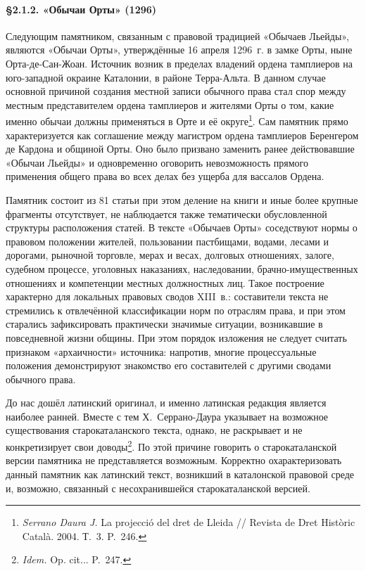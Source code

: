 \paragraph*{§2.1.2. «Обычаи Орты» (1296)}

Следующим памятником, связанным с правовой традицией «Обычаев Льейды», являются «Обычаи Орты», утверждённые 16 апреля 1296~г. в замке Орты, ныне Орта-де-Сан-Жоан. Источник возник в пределах владений ордена тамплиеров на юго-западной окраине Каталонии, в районе Терра-Альта. В данном случае основной причиной создания местной записи обычного права стал спор между местным представителем ордена тамплиеров и жителями Орты о том, какие именно обычаи должны применяться в Орте и её округе\footnote{\emph{Serrano Daura J. }La projecció del dret de Lleida // Revista de Dret Històric Català. 2004. Т.~3. P.~246.}. Сам памятник прямо характеризуется как соглашение между магистром ордена тамплиеров Беренгером де Кардона и общиной Орты. Оно было призвано заменить ранее действовавшие «Обычаи Льейды» и одновременно оговорить невозможность прямого применения общего права во всех делах без ущерба для вассалов Ордена.

Памятник состоит из 81 статьи при этом деление на книги и иные более крупные фрагменты отсутствует, не наблюдается также тематически обусловленной структуры расположения статей. В тексте «Обычаев Орты» соседствуют нормы о правовом положении жителей, пользовании пастбищами, водами, лесами и дорогами, рыночной торговле, мерах и весах, долговых отношениях, залоге, судебном процессе, уголовных наказаниях, наследовании, брачно-имущественных отношениях и компетенции местных должностных лиц. Такое построение характерно для локальных правовых сводов XIII~в.: составители текста не стремились к отвлечённой классификации норм по отраслям права, и при этом старались зафиксировать практически значимые ситуации, возникавшие в повседневной жизни общины. При этом порядок изложения не следует считать признаком «архаичности» источника: напротив, многие процессуальные положения демонстрируют знакомство его составителей с другими сводами обычного права.

До нас дошёл латинский оригинал, и именно латинская редакция является наиболее ранней. Вместе с тем Х.~Серрано-Даура указывает на возможное существования старокаталанского текста, однако, не раскрывает и не конкретизирует свои доводы\footnote{\emph{ Idem. }Op. cit... P.~247.}. По этой причине говорить о старокаталанской версии памятника не представляется возможным. Корректно охарактеризовать данный памятник как латинский текст, возникший в каталонской правовой среде и, возможно, связанный с несохранившейся старокаталанской версией.

